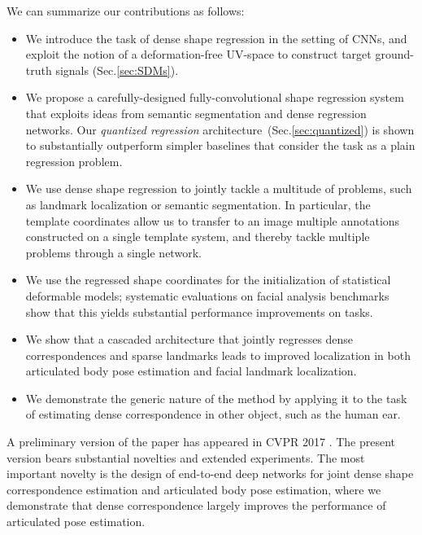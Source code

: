 

We can summarize our contributions as follows:
\begin{itemize}
\item We introduce the task of dense shape regression in the setting of CNNs, and exploit the notion of a deformation-free UV-space to construct target ground-truth signals (Sec.\ref{sec:SDMs}).
\item We propose a carefully-designed fully-convolutional shape regression system that exploits ideas from semantic segmentation and dense regression networks. Our \textit{quantized regression} architecture~(Sec.\ref{sec:quantized}) is shown to substantially outperform simpler baselines that consider the task as a plain regression problem. 
\item We use dense shape regression to jointly tackle a multitude of problems, such as landmark localization or semantic segmentation.
In particular, the template coordinates allow us to transfer to an image multiple annotations constructed on a single template system, and thereby tackle multiple problems through a single network.
\item We use the regressed shape coordinates for the initialization of statistical deformable models; systematic evaluations on facial analysis benchmarks show that this yields substantial performance improvements  on tasks.
\item We  show that a cascaded architecture that jointly regresses dense correspondences and sparse landmarks leads to improved localization in both articulated body pose estimation and facial landmark localization. 
\item We  demonstrate the generic nature of the method by applying it to the task of estimating dense correspondence in other object, such as the human ear.
\end{itemize}
A preliminary version of the paper has appeared in CVPR 2017 \cite{guler2016densereg}. The present version bears substantial novelties and extended experiments. The most important novelty is the design of end-to-end deep networks for joint dense shape correspondence estimation and articulated body pose estimation, where we demonstrate that dense correspondence largely improves the performance of articulated pose estimation.
    
